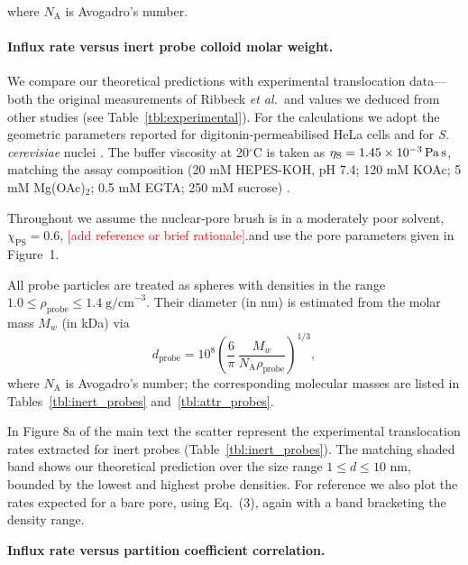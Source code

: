 \documentclass[10pt, a4paper]{article}
\newcommand\todo[1]{\textcolor{red}{#1}}
\begin{document}
\begin{multicols}{2}
where \(N_{\mathrm{A}}\) is Avogadro's number.


\paragraph{Influx rate versus inert probe colloid molar weight.}

We compare our theoretical predictions with experimental translocation data—both the original measurements of Ribbeck \textit{et al.}\,\cite{Ribbeck2001} and values we deduced from other studies \cite{Mohr2009,Popken2015,Timney2016,Frey2018} (see Table~\ref{tbl:experimental}).  
For the calculations we adopt the geometric parameters reported for digitonin-permeabilised HeLa cells \cite{Ribbeck2001} and for \textit{S.\,cerevisiae} nuclei \cite{Timney2016}.  
The buffer viscosity at 20$^\circ$C is taken as
$\eta_{\text{S}} = 1.45\times10^{-3}\,\text{Pa\,s}$, matching the assay composition (20 mM HEPES-KOH, pH 7.4; 120 mM KOAc; 5 mM Mg(OAc)$_2$; 0.5 mM EGTA; 250 mM sucrose) \cite{Ribbeck2001}.

Throughout we assume the nuclear-pore brush is in a moderately poor solvent, $\chi_{\text{PS}} = 0.6$, \todo{[add reference or brief rationale]}.and use the pore parameters given in Figure~1.

All probe particles are treated as spheres with densities in the range $1.0 \le \rho_{\text{probe}} \le 1.4\;\text{g/cm}^{-3}$.  Their
diameter (in nm) is estimated from the molar mass $M_{w}$ (in kDa) via
\begin{equation}
  d_{\text{probe}}
  = 10^{8}
    \left(
      \frac{6}{\pi}\,
      \frac{M_{w}}{N_{\text{A}}\rho_{\text{probe}}}
    \right)^{\!1/3},
  \label{eq:d_probe}
\end{equation}
where $N_{\text{A}}$ is Avogadro’s number; the corresponding molecular masses are listed in Tables~\ref{tbl:inert_probes} and~\ref{tbl:attr_probes}.

In Figure 8a of the main text the scatter represent the experimental translocation rates extracted for inert probes (Table~\ref{tbl:inert_probes}).
The matching shaded band shows our theoretical prediction over the size range $1 \le d \le 10$ nm, bounded by the lowest and highest probe densities.
For reference we also plot the rates expected for a bare pore, using Eq.~(3), again with a band bracketing the density range.

\textbf{Influx rate versus partition coefficient correlation.}


\end{multicols}
\end{document}
